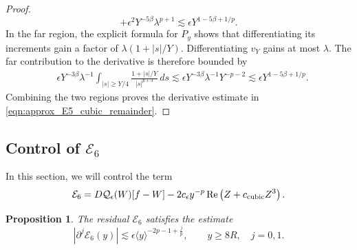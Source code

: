 \documentclass[11pt]{amsart}
\newtheorem{proposition}[theorem]{Proposition}
\theoremstyle{definition}
\theoremstyle{remark}
\numberwithin{equation}{section}
\newcommand{\mc}[1]{\mathcal{#1}}
\newcommand{\ang}[1]{\langle #1 \rangle}
\begin{document}
\begin{proof}
\[        +\epsilon^2Y^{-5\beta}\lambda^{p+1}
        \lesssim\epsilon Y^{1-5\beta+1/p}.
    \]
    In the far region, the explicit formula for $P_y$ shows that differentiating its increments gain a factor of $\lambda(1+|s|/Y)$. Differentiating $v_Y$ gains at most $\lambda$. The far contribution to the derivative is therefore bounded by
    \[
    \begin{aligned}
        &\epsilon Y^{-3\beta}\lambda^{-1}
        \int_{|s|\geq Y/4}\frac{1+|s|/Y}{|s|^{p+3}}\,ds \lesssim\epsilon Y^{-3\beta}\lambda^{-1}Y^{-p-2}
        \lesssim\epsilon Y^{1-5\beta+1/p}.
    \end{aligned}
    \]
    Combining the two regions proves the derivative estimate in \eqref{eqn:approx_E5_cubic_remainder}.
\end{proof}

\subsection{Control of \texorpdfstring{$\mc{E}_6$}{E6}}

In this section, we will control the term
\[\mc{E}_6=D\mc{Q}_\epsilon(W)[f-W]
  -2c_\epsilon y^{-p}\operatorname{Re}\left(Z+c_{\textup{cubic}}Z^3\right).\]
\begin{proposition}\label{prop:approx_E6}
    The residual $\mc{E}_6$ satisfies the estimate
    \begin{equation}\label{eqn:approx_E6_bound}
        |\partial^j\mc{E}_6(y)|
        \lesssim\epsilon\ang{y}^{-2p-1+\frac{j}{p}},
        \qquad y\geq8R,\quad j=0,1.
    \end{equation}
\end{proposition}
\end{document}
